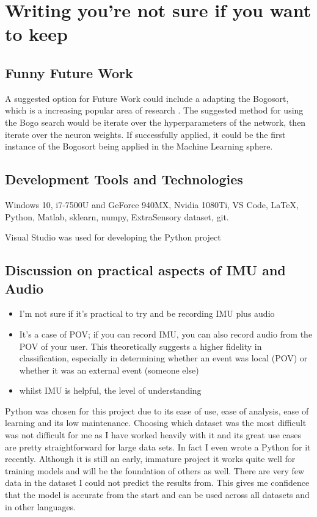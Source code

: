 \documentclass{UoNMCHA}
\numberwithin{equation}{section}
\begin{document}
\section{Writing you're not sure if you want to keep}


\subsection{Funny Future Work}
A suggested option for Future Work could include a adapting the Bogosort, which is a increasing popular area of research \cite{Bogo_Gruber2007} \cite{Bogo_Holzer2018} \cite{Bogo_max}. The suggested method for using the Bogo search would be iterate over the hyperparameters of the network, then iterate over the neuron weights. If successfully applied, it could be the first instance of the Bogosort being applied in the Machine Learning sphere.



\subsection{Development Tools and Technologies}
Windows 10, i7-7500U and GeForce 940MX, Nvidia 1080Ti, VS Code, LaTeX, Python, Matlab, sklearn, numpy, ExtraSensory dataset, git.

Visual Studio was used for developing the Python project

\subsection{Discussion on practical aspects of IMU and Audio}

\begin{itemize}
    \item I'm not sure if it's practical to try and be recording IMU plus audio
    \item It's a case of POV; if you can record IMU, you can also record audio from the POV of your user. This theoretically suggests a higher fidelity in classification, especially in determining whether an event was local (POV) or whether it was an external event (someone else)
    \item whilst IMU is helpful, the level of understanding
\end{itemize}

Python was chosen for this project due to its ease of use, ease of analysis, ease of learning and its low maintenance. Choosing which dataset was the most difficult was not difficult for me as I have worked heavily with it and its great use cases are pretty straightforward for large data sets. In fact I even wrote a Python for it recently. Although it is still an early, immature project it works quite well for training models and will be the foundation of others as well. There are very few data in the dataset I could not predict the results from. This gives me confidence that the model is accurate from the start and can be used across all datasets and in other languages.
\end{document}
